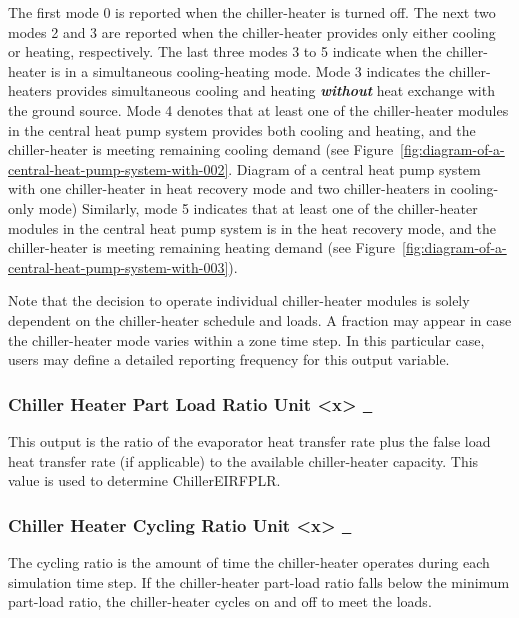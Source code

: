 The first mode 0 is reported when the chiller-heater is turned off. The next two modes 2 and 3 are reported when the chiller-heater provides only either cooling or heating, respectively. The last three modes 3 to 5 indicate when the chiller-heater is in a simultaneous cooling-heating mode. Mode 3 indicates the chiller-heaters provides simultaneous cooling and heating \textbf{\emph{without}} heat exchange with the ground source. Mode 4 denotes that at least one of the chiller-heater modules in the central heat pump system provides both cooling and heating, and the chiller-heater is meeting remaining cooling demand (see Figure~\ref{fig:diagram-of-a-central-heat-pump-system-with-002}. Diagram of a central heat pump system with one chiller-heater in heat recovery mode and two chiller-heaters in cooling-only mode) Similarly, mode 5 indicates that at least one of the chiller-heater modules in the central heat pump system is in the heat recovery mode, and the chiller-heater is meeting remaining heating demand (see Figure~\ref{fig:diagram-of-a-central-heat-pump-system-with-003}).

Note that the decision to operate individual chiller-heater modules is solely dependent on the chiller-heater schedule and loads. A fraction may appear in case the chiller-heater mode varies within a zone time step. In this particular case, users may define a detailed reporting frequency for this output variable.

\subsubsection{Chiller Heater Part Load Ratio Unit \textless{}x\textgreater{} \protect\hyperlink{section-1}{~}}\label{chiller-heater-part-load-ratio-unit-x}

This output is the ratio of the evaporator heat transfer rate plus the false load heat transfer rate (if applicable) to the available chiller-heater capacity. This value is used to determine ChillerEIRFPLR.

\subsubsection{Chiller Heater Cycling Ratio Unit \textless{}x\textgreater{} \protect\hyperlink{section-1}{~}}\label{chiller-heater-cycling-ratio-unit-x}

The cycling ratio is the amount of time the chiller-heater operates during each simulation time step. If the chiller-heater part-load ratio falls below the minimum part-load ratio, the chiller-heater cycles on and off to meet the loads.

